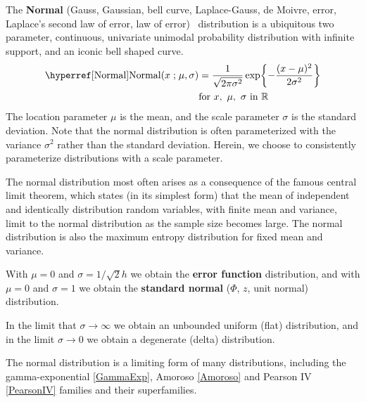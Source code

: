 

\label{sec:Normal}
The  {\bf Normal} (Gauss, Gaussian, bell curve, Laplace-Gauss, de Moivre, error, Laplace's second law of error, law of error)~\cite{Moivre1733,Johnson1994} distribution is a ubiquitous two parameter, continuous, univariate unimodal probability distribution with infinite support, and an iconic bell shaped curve. 
%
\begin{align}
\label{Normal}
\opr{Normal}(x\given \mu,\sigma) 
&=
\frac{1}{\sqrt{2 \pi \sigma^2}}  \exp\Left\{ - \frac{( x-\mu)^2}{2\sigma^2} \Right\} \checked
\\
& \text{for } x,\ \mu,\  \sigma \text{ in }  \mathbb{R}						\checked 
\notag
\end{align}
The location parameter $\mu$ is the mean, and the scale parameter $\sigma$ is the standard deviation. Note that the normal distribution is often parameterized with the variance $\sigma^2$ rather than the standard deviation. Herein, we choose to consistently parameterize distributions with a scale parameter.  

The normal distribution most often arises as a consequence of the famous central limit theorem, which states (in its simplest form) that the mean of independent and identically distribution random variables, with finite mean and variance, limit to the normal distribution as the sample size becomes large. 
The normal distribution is also the maximum entropy distribution for fixed mean and variance.




With $\mu=0$ and $\sigma = 1/ \sqrt{2} h$ we obtain the {\bf error function} distribution, and
with $\mu=0$ and $\sigma=1$ we obtain the {\bf standard normal} ($\Phi$, $z$, unit normal)  distribution. 


 In the limit that $\sigma\rightarrow\infty$ we obtain an unbounded uniform (flat) distribution, and in the limit $\sigma\rightarrow0$ we obtain a degenerate (delta) distribution. 
 
The normal distribution is a limiting form of many distributions, including the gamma-exponential \eqref{GammaExp}, Amoroso \eqref{Amoroso} and Pearson IV \eqref{PearsonIV} families and their superfamilies. 



